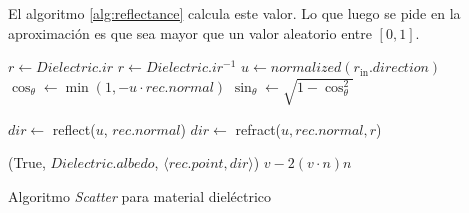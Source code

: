 El algoritmo \ref{alg:reflectance} calcula este valor. Lo que luego se pide en
la aproximación es que sea mayor que un valor aleatorio entre $[0, 1]$.

\begin{algorithm}[H]
\begin{algorithmic}[1]
    \State $r \gets Dielectric.ir$
        \State $r \gets Dielectric.ir^{-1}$
    \EndIf
    \State $u \gets normalized(r_{\text{in}}.direction)$
    \State $\cos_{\theta} \gets \min(1, -u \cdot rec.normal)$
    \State $\sin_{\theta} \gets \sqrt{1 - \cos_{\theta}^2}$

        \State $dir \gets$ reflect($u$, $rec.normal$)
    \Else
        \State $dir \gets$ refract($u, rec.normal, r$)
    \EndIf

    \State \Return (True, $Dielectric.albedo$, $\langle rec.point, dir \rangle$)
\EndFunction
{}
    \State \Return $v - 2 (v \cdot n) n$
\EndFunction
\end{algorithmic}
\caption{Algoritmo \textit{Scatter} para material dieléctrico}
\label{alg:dielectric-scatter}
\end{algorithm}
